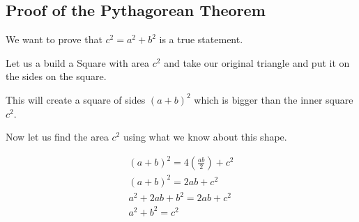 \subsection{Proof of the Pythagorean Theorem}

We want to prove that \(c^2 = a^2 + b^2\) is a true statement.

Let us a build a Square with area \(c^2\) and take our original triangle and put it on the sides
on the square.

This will create a square of sides \((a+b)^2\) which is bigger than the inner square \(c^2\).

Now let us find the area \(c^2\) using what we know about this shape.

\begin{align*}
	{(a + b)}^2 = 4(\frac{ab}{2}) + c^2\\
	{(a + b)}^2 = 2ab + c^2\\
	a^2 + 2ab + b^2 = 2ab + c^2\\
	a^2 + b^2 = c^2
\end{align*}

\QED

